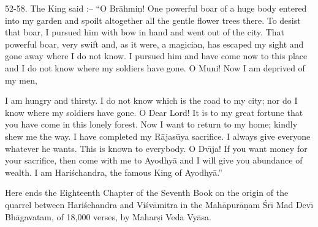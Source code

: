 52-58. The King said :-- ``O Br\=ahmi\d{n}! One powerful boar of a huge body entered into my garden and spoilt altogether all the gentle flower trees there. To desist that boar, I pursued him with bow in hand and went out of the city. That powerful boar, very swift and, as it were, a magician, has escaped my sight and gone away where I do not know. I pursued him and have come now to this place and I do not know where my soldiers have gone. O Muni! Now I am deprived of my men,

I am hungry and thirsty. I do not know which is the road to my city; nor do I know where my soldiers have gone. O Dear Lord! It is to my great fortune that you have come in this lonely forest. Now I want to return to my home; kindly shew me the way. I have completed my R\=ajas\=uya sacrifice. I always give everyone whatever he wants. This is known to everybody. O Dv\={\i}ja! If you want money for your sacrifice, then come with me to Ayodhy\=a and I will give you abundance of wealth. I am Hari\'schandra, the famous King of Ayodhy\=a.''

Here ends the Eighteenth Chapter of the Seventh Book on the origin of the quarrel between Hari\'schandra and Vi\'sv\=amitra in the Mah\=apur\=a\d{n}am \'Sr\={\i} Mad Dev\={\i} Bh\=agavatam, of 18,000 verses, by Mahar\d{s}i Veda Vy\=asa.



